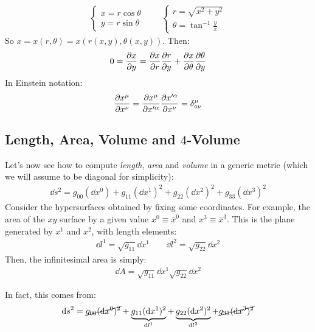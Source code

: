 \documentclass[../template.tex]{subfiles}
\begin{document}
\begin{example}
    \begin{align*}
        \begin{cases}
            x = r\cos \theta\\
            y = r\sin \theta
        \end{cases}
        \qquad 
        \begin{cases}
            r = \sqrt{x^2 + y^2}\\
            \theta = \tan^{-1} \frac{y}{x} 
        \end{cases}
    \end{align*}
    So $x = x(r, \theta) = x(r(x,y), \theta(x, y))$. Then:
    \begin{align*}
        0 = \pdv{x}{y} = \pdv{x}{r} \pdv{r}{y} + \pdv{x}{\theta}\pdv{\theta}{y}
    \end{align*} 
    In Einstein notation:
    \begin{align*}
        \pdv{x^\mu}{x^\nu} = \pdv{x^\mu}{x'^\alpha}\pdv{x'^\alpha}{x^\nu} = \delta^{\mu}_{\diamond \nu}
    \end{align*}
\end{example}

\subsection{Length, Area, Volume and $4$-Volume}
Let's now see how to compute \textit{length}, \textit{area} and \textit{volume} in a generic metric (which we will assume to be diagonal for simplicity):
\begin{align*}
    \dd{s}^2 = g_00 (\dd{x^0}) + g_{11}(\dd{x^1})^2 + g_{22}(\dd{x^2})^2 + g_{33} (\dd{x}^3)^2
\end{align*}    
Consider the hypersurfaces obtained by fixing some coordinates. For example, the area of the $xy$ surface by a given value $x^0 \equiv \bar{x}^0$ and $x^3 \equiv \bar{x}^3$. This is the plane generated by $x^1$ and $x^2$, with length elements:
\begin{align*}
    \dd{l^1} = \sqrt{g_{11}} \dd{x^1} \qquad \dd{l^2} = \sqrt{g_{22}}\dd{x^2}
\end{align*}
Then, the infinitesimal area is simply:
\begin{align*}
    \dd{A} = \sqrt{g_{11} }\dd{x^1} \sqrt{g_{22} }\dd{x^2}
\end{align*}

In fact, this comes from:
\begin{align*}
    \dd{s}^2 = \cancel{g_{00} (\dd{x^0})^2 }+ \underbrace{g_{11}(\dd{x^1})^2 }_{\dd{l^1}}+\underbrace{ g_{22}(\dd{x^2})^2 }_{\dd{l^2}}+\cancel{ g_{33}(\dd{x^3})^2}
\end{align*}
\end{document}
